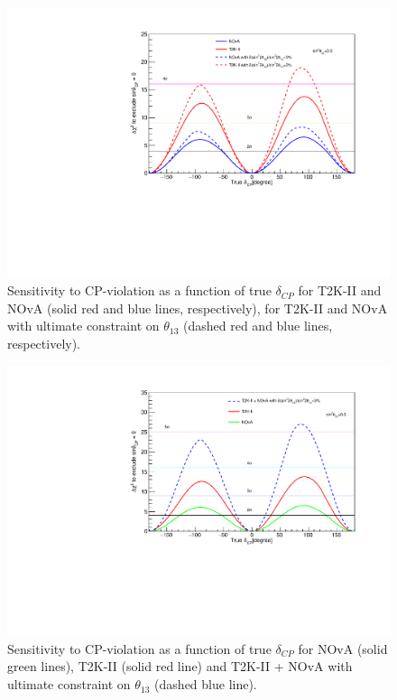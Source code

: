 \documentclass[a4 paper,12pt]{report}%
\begin{document}
     \begin{figure}
 	\centering
 	\includegraphics[scale=0.5]{improve_th13.pdf} 
 	\caption{\label{fig3} Sensitivity to CP-violation as a function of true $\delta_{CP}$ for T2K-II and NOvA (solid red and blue lines, respectively), for T2K-II and NOvA with ultimate constraint on $\theta_{13}$ (dashed red and blue lines, respectively).} 
 \end{figure}
 
      \begin{figure}
 	\centering
 	\includegraphics[scale=0.5]{improve_nova.pdf} 
 	\caption{\label{fig4} Sensitivity to CP-violation as a function of true $\delta_{CP}$ for NOvA (solid green lines), T2K-II (solid red line) and T2K-II + NOvA with ultimate constraint on $\theta_{13}$ (dashed blue line).} 
 \end{figure}
\end{document}
